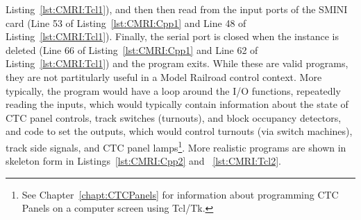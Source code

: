 Listing~\ref{lst:CMRI:Tcl1}), and then then read from the input ports
of the SMINI card (Line 53 of Listing~\ref{lst:CMRI:Cpp1} and Line 48
of Listing~\ref{lst:CMRI:Tcl1}). Finally, the serial port is closed
when the instance is deleted (Line 66 of Listing~\ref{lst:CMRI:Cpp1}
and Line 62 of Listing~\ref{lst:CMRI:Tcl1}) and the program exits.
While these are valid programs, they are not partitularly useful in a
Model Railroad control context.  More typically, the program would have
a loop around the I/O functions, repeatedly reading the inputs, which
would typically contain information about the state of CTC panel
controls, track switches (turnouts), and block occupancy detectors, and
code to set the outputs, which would control turnouts (via switch machines),
track side signals, and CTC panel lamps\footnote{See
Chapter~\ref{chapt:CTCPanels} for information about programming CTC
Panels on a computer screen using Tcl/Tk.}.  More realistic programs
are shown in skeleton form in Listings~\ref{lst:CMRI:Cpp2} and
~\ref{lst:CMRI:Tcl2}.

